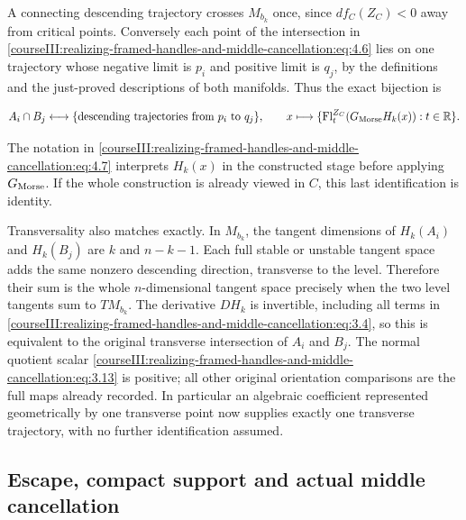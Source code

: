 A connecting descending trajectory crosses \(M_{b_k}\) once, since \(df_C(Z_C)<0\) away from critical points. Conversely each point of the intersection in \eqref{courseIII:realizing-framed-handles-and-middle-cancellation:eq:4.6} lies on one trajectory whose negative limit is \(p_i\) and positive limit is \(q_j\), by the definitions and the just-proved descriptions of both manifolds. Thus the exact bijection is

\begin{equation}
A_i\cap B_j
 \longleftrightarrow
 \{\text{descending trajectories from }p_i\text{ to }q_j\},
 \qquad
 x\longmapsto\{\operatorname{Fl}^{Z_C}_t(G_{\rm Morse}H_k(x)):t\in\mathbb R\}.
 \label{courseIII:realizing-framed-handles-and-middle-cancellation:eq:4.7}
\end{equation}

The notation in \eqref{courseIII:realizing-framed-handles-and-middle-cancellation:eq:4.7} interprets \(H_k(x)\) in the constructed stage before applying \(G_{\rm Morse}\). If the whole construction is already viewed in \(C\), this last identification is identity.

Transversality also matches exactly. In \(M_{b_k}\), the tangent dimensions of \(H_k(A_i)\) and \(H_k(B_j)\) are \(k\) and \(n-k-1\). Each full stable or unstable tangent space adds the same nonzero descending direction, transverse to the level. Therefore their sum is the whole \(n\)-dimensional tangent space precisely when the two level tangents sum to \(TM_{b_k}\). The derivative \(DH_k\) is invertible, including all terms in \eqref{courseIII:realizing-framed-handles-and-middle-cancellation:eq:3.4}, so this is equivalent to the original transverse intersection of \(A_i\) and \(B_j\). The normal quotient scalar \eqref{courseIII:realizing-framed-handles-and-middle-cancellation:eq:3.13} is positive; all other original orientation comparisons are the full maps already recorded. In particular an algebraic coefficient represented geometrically by one transverse point now supplies exactly one transverse trajectory, with no further identification assumed.

\subsection{Escape, compact support and actual middle cancellation}
\label{courseIII:realizing-framed-handles-and-middle-cancellation:middle-trajectory-cancellation}

\label{courseIII:realizing-framed-handles-and-middle-cancellation:section-5}\label{courseIII:middle-cancel:5}

